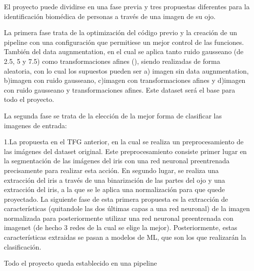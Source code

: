
El proyecto puede dividirse en una fase previa y tres propuestas diferentes para la identificación biomédica de personas a través de una imagen de su ojo.

La primera fase trata de la optimización del código previo y la creación de un pipeline con una configuración que permitiese un mejor control de las funciones. 
También del  data augnmentation, en el cual se aplica tanto ruido gausseano (de 2.5, 5 y 7.5) como transformaciones afines (), siendo realizadas de 
forma aleatoria, con lo cual los supuestos pueden ser a) imagen sin data augnmentation, b)imagen con ruido gausseano, c)imagen con transformaciones afines y 
d)imagen con ruido gausseano y transformaciones afines. Este dataset será el base para todo el proyecto.

La segunda fase se trata de la elección de la mejor forma de clasificar las imagenes de entrada:

1.La propuesta en el TFG anterior, en la cual se realiza un preprocesamiento de las imágenes del dataset original. Este preprocesamiento consiste primer lugar 
en la segmentación de las imágenes del iris con una red neuronal preentrenada precisamente para realizar esta acción. En segundo lugar, se realiza una extracción
del iris a través de una binarización de las partes del ojo y una extracción del iris, a la que se le aplica una normalización para que quede proyectado.
La siguiente fase de esta primera propuesta es la extracción de características (quitandole las dos últimas capas a una red neuronal) de la imagen normalizada
 para posteriormente utilizar una red neuronal preentrenada con imagenet (de hecho 3 redes de la cual se elige la mejor). Posteriormente, estas características
 extraidas se pasan a modelos de ML, que son los que realizarán la clasificación. 

 Todo el proyecto queda establecido en una pipeline
